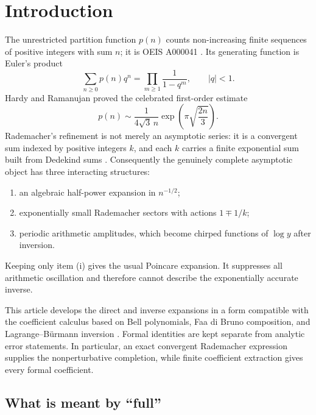 \documentclass[11pt,a4paper]{article}
\numberwithin{equation}{section}
\theoremstyle{definition}
\theoremstyle{remark}
\newcommand{\abs}[1]{\lvert#1\rvert}
\begin{document}
\tableofcontents
\clearpage

\section{Introduction}

The unrestricted partition function $p(n)$ counts non-increasing finite
sequences of positive integers with sum $n$; it is OEIS A000041
\cite{OEISA000041}.  Its generating function is
Euler's product
\begin{equation}\label{eq:euler-product}
 \sum_{n\geq0}p(n)q^n=\prod_{m\geq1}\frac1{1-q^m},\qquad \abs q<1.
\end{equation}
Hardy and Ramanujan proved the celebrated first-order estimate
\cite{HardyRamanujan1918}
\begin{equation}\label{eq:HR}
 p(n)\sim \frac{1}{4\sqrt3\,n}
 \exp\!\left(\pi\sqrt{\frac{2n}{3}}\right).
\end{equation}
Rademacher's refinement is not merely an asymptotic series: it is a convergent
sum indexed by positive integers $k$, and each $k$ carries a finite exponential
sum built from Dedekind sums \cite{Rademacher1937PNAS,Rademacher1938,Rademacher1943,Lehmer1939,KongTeo2023}.  Consequently the genuinely complete asymptotic
object has three interacting structures:
\begin{enumerate}[label=(\roman*)]
\item an algebraic half-power expansion in $n^{-1/2}$;
\item exponentially small Rademacher sectors with actions $1\mp1/k$;
\item periodic arithmetic amplitudes, which become chirped functions of
      $\log y$ after inversion.
\end{enumerate}
Keeping only item (i) gives the usual Poincare expansion.  It suppresses all
arithmetic oscillation and therefore cannot describe the exponentially accurate
inverse.

This article develops the direct and inverse expansions in a form compatible
with the coefficient calculus based on Bell polynomials, Faa di Bruno
composition, and Lagrange--B\"urmann inversion
\cite{CombinatorialCoefficientCalculus,PolynomialLogTransseries}.  Formal identities are kept
separate from analytic error statements.  In particular, an exact convergent
Rademacher expression supplies the nonperturbative completion, while finite
coefficient extraction gives every formal coefficient.

\subsection{What is meant by ``full''}
\end{document}
